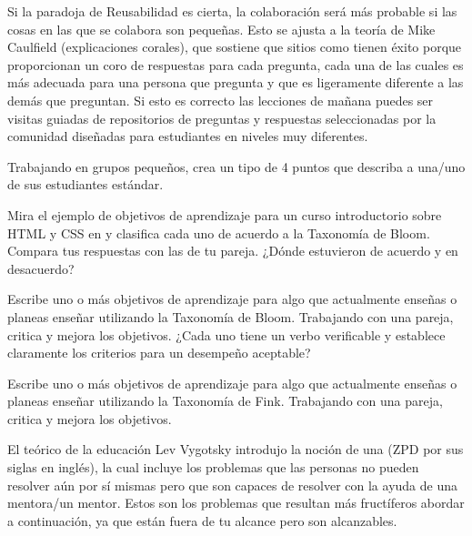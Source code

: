Si la paradoja de Reusabilidad es cierta,
la colaboración será más probable
si las cosas en las que se colabora son pequeñas.
Esto se ajusta a la teoría de Mike Caulfield 
(explicaciones corales),
que sostiene que sitios como
 tienen éxito porque
proporcionan un coro de respuestas para cada pregunta,
cada una de las cuales es más adecuada para
una persona que pregunta y que es ligeramente diferente a las demás que preguntan.
Si esto es correcto
las lecciones de mañana puedes ser visitas guiadas de repositorios
de preguntas y respuestas seleccionadas por la comunidad
diseñadas para estudiantes en niveles muy diferentes.
 
 
 
 
Trabajando en grupos pequeños,
crea un tipo de 4 puntos que describa a una/uno de sus estudiantes estándar.
 
 
Mira el ejemplo de objetivos de aprendizaje
para un curso introductorio sobre HTML y CSS
en 
y clasifica cada uno de acuerdo a la Taxonomía de Bloom.
Compara tus respuestas con las de tu pareja.
¿Dónde estuvieron de acuerdo y en desacuerdo?
 
 
Escribe uno o más objetivos de aprendizaje
para algo que actualmente enseñas o planeas enseñar
utilizando la Taxonomía de Bloom.
Trabajando con una pareja,
critica y mejora los objetivos.
¿Cada uno tiene un verbo verificable y establece claramente
los criterios  para un desempeño aceptable?
 
 
Escribe uno o más objetivos de aprendizaje
para algo que actualmente enseñas o planeas enseñar
utilizando la Taxonomía de Fink.
Trabajando con una pareja,
critica y mejora los objetivos.
 
 
El teórico de la educación Lev Vygotsky introdujo la noción de una 
 (ZPD por sus siglas en inglés),
la cual incluye los problemas que las personas no pueden resolver aún por sí mismas
pero que son capaces de resolver con la ayuda de una mentora/un mentor.
Estos son los problemas que resultan más fructíferos abordar a continuación,
ya que están fuera de tu alcance pero son alcanzables.
 
